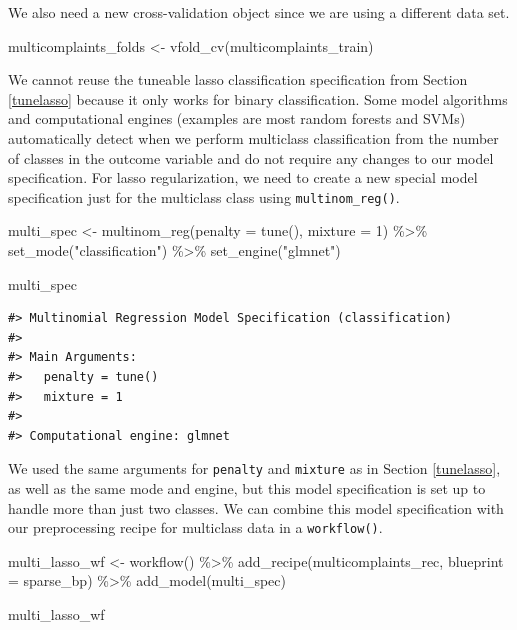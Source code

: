 \documentclass[
]{krantz}
\makeatletter
\newenvironment{Shaded}{\begin{snugshade}}{\end{snugshade}}
\newcommand{\AttributeTok}[1]{\textcolor[rgb]{0.77,0.63,0.00}{#1}}
\newcommand{\DecValTok}[1]{\textcolor[rgb]{0.00,0.00,0.81}{#1}}
\newcommand{\FunctionTok}[1]{\textcolor[rgb]{0.00,0.00,0.00}{#1}}
\newcommand{\NormalTok}[1]{#1}
\newcommand{\OtherTok}[1]{\textcolor[rgb]{0.56,0.35,0.01}{#1}}
\newcommand{\SpecialCharTok}[1]{\textcolor[rgb]{0.00,0.00,0.00}{#1}}
\newcommand{\StringTok}[1]{\textcolor[rgb]{0.31,0.60,0.02}{#1}}
\newenvironment{kframe}{%
\medskip{}
\setlength{\fboxsep}{.8em}
 \def\at@end@of@kframe{}%
 \ifinner\ifhmode%
  \def\at@end@of@kframe{\end{minipage}}%
  \begin{minipage}{\columnwidth}%
 \fi\fi%
 \def\FrameCommand##1{\hskip\@totalleftmargin \hskip-\fboxsep
 \colorbox{shadecolor}{##1}\hskip-\fboxsep
     \hskip-\linewidth \hskip-\@totalleftmargin \hskip\columnwidth}%
 \MakeFramed {\advance\hsize-\width
   \@totalleftmargin\z@ \linewidth\hsize
   \@setminipage}}%
 {\par\unskip\endMakeFramed%
 \at@end@of@kframe}
\renewenvironment{Shaded}{\begin{kframe}}{\end{kframe}}
\makeatother
\begin{document}
We also need a new cross-validation object since we are using a different data set.

\begin{Shaded}
\begin{Highlighting}[]
\NormalTok{multicomplaints\_folds }\OtherTok{\textless{}{-}} \FunctionTok{vfold\_cv}\NormalTok{(multicomplaints\_train)}
\end{Highlighting}
\end{Shaded}

We cannot reuse the tuneable lasso classification specification from Section \ref{tunelasso} because it only works for binary classification. Some model algorithms and computational engines (examples are most random forests and SVMs) automatically detect when we perform multiclass classification from the number of classes in the outcome variable and do not require any changes to our model specification. For lasso regularization, we need to create a new special model specification just for the multiclass class using \texttt{multinom\_reg()}.

\begin{Shaded}
\begin{Highlighting}[]
\NormalTok{multi\_spec }\OtherTok{\textless{}{-}} \FunctionTok{multinom\_reg}\NormalTok{(}\AttributeTok{penalty =} \FunctionTok{tune}\NormalTok{(), }\AttributeTok{mixture =} \DecValTok{1}\NormalTok{) }\SpecialCharTok{\%\textgreater{}\%}
  \FunctionTok{set\_mode}\NormalTok{(}\StringTok{"classification"}\NormalTok{) }\SpecialCharTok{\%\textgreater{}\%}
  \FunctionTok{set\_engine}\NormalTok{(}\StringTok{"glmnet"}\NormalTok{)}

\NormalTok{multi\_spec}
\end{Highlighting}
\end{Shaded}

\begin{verbatim}
#> Multinomial Regression Model Specification (classification)
#> 
#> Main Arguments:
#>   penalty = tune()
#>   mixture = 1
#> 
#> Computational engine: glmnet
\end{verbatim}

We used the same arguments for \texttt{penalty} and \texttt{mixture} as in Section \ref{tunelasso}, as well as the same mode and engine, but this model specification is set up to handle more than just two classes. We can combine this model specification with our preprocessing recipe for multiclass data in a \texttt{workflow()}.

\begin{Shaded}
\begin{Highlighting}[]
\NormalTok{multi\_lasso\_wf }\OtherTok{\textless{}{-}} \FunctionTok{workflow}\NormalTok{() }\SpecialCharTok{\%\textgreater{}\%}
  \FunctionTok{add\_recipe}\NormalTok{(multicomplaints\_rec, }\AttributeTok{blueprint =}\NormalTok{ sparse\_bp) }\SpecialCharTok{\%\textgreater{}\%}
  \FunctionTok{add\_model}\NormalTok{(multi\_spec)}

\NormalTok{multi\_lasso\_wf}
\end{Highlighting}
\end{Shaded}
\end{document}
